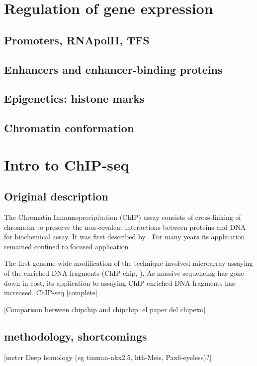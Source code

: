 \section{Regulation of gene expression}

\subsection{Promoters, RNApolII, TFS}

\subsection{Enhancers and enhancer-binding proteins}

\subsection{Epigenetics: histone marks}

\subsection{Chromatin conformation}

\section{Intro to ChIP-seq}

\subsection{Original description}
The Chromatin Immunoprecipitation (ChIP) assay consists of cross-linking of chromatin to preserve the non-covalent interactions between proteins and DNA for biochemical assay. It was first described by \cite{Solomon1988}. For many years its application remained confined to focused application \cite{Mardis2007}.  

The first genome-wide modification of the technique involved microarray assaying of the enriched DNA fragments (ChIP-chip, \cite{Ren2000}). As massive sequencing has gone down in cost, its application to assaying ChIP-enriched DNA fragments has increased. ChIP-seq \cite{Robertson2007} [complete]

[Comparison between chipchip and chipchip: el paper del chipexo]

\subsection{methodology, shortcomings}




[meter Deep homology (eg tinman-nkx2.5, hth-Meis, Pax6-eyeless)?]